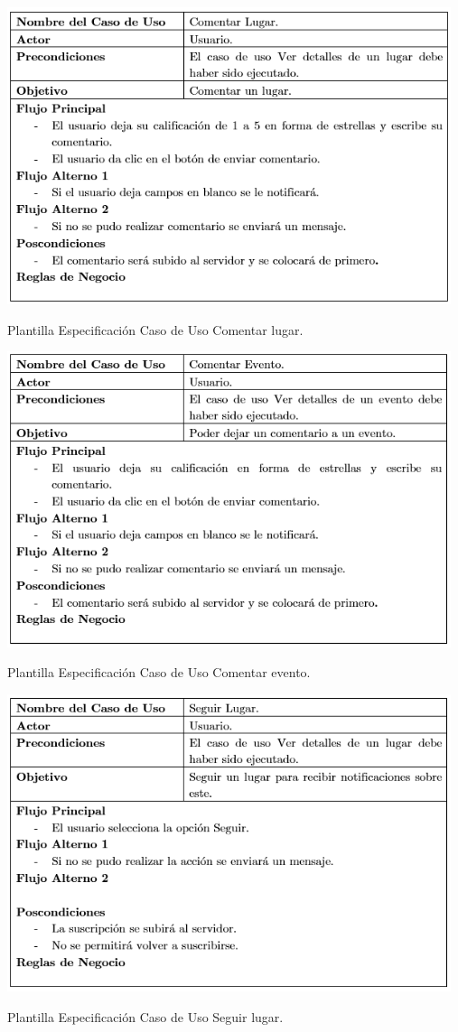 \documentclass[12pt,letterpaper,openany]{book}
\begin{document}
\begin{table}[H]
\centering
\includegraphics[width=13cm]{./imagenes/PCU/comentar_lugar}
\caption{Plantilla Especificación Caso de Uso Comentar lugar.}
\end{table}

\begin{table}[H]
\centering
\includegraphics[width=13cm]{./imagenes/PCU/comentar_evento}
\caption{Plantilla Especificación Caso de Uso Comentar evento.}
\end{table}

\begin{table}[H]
\centering
\includegraphics[width=13cm]{./imagenes/PCU/seguir_lugar}
\caption{Plantilla Especificación Caso de Uso Seguir lugar.}
\end{table}
\end{document}
